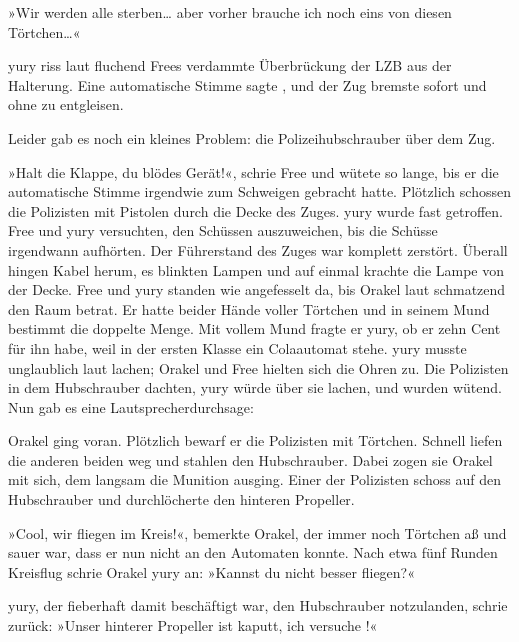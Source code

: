 »Wir werden alle sterben… aber vorher brauche ich noch eins von diesen Törtchen…«

yury riss laut fluchend Frees verdammte Überbrückung der LZB aus der Halterung. Eine automatische Stimme sagte , und der Zug bremste sofort und ohne zu entgleisen.


Leider gab es noch ein kleines Problem: die Polizeihubschrauber über dem Zug.


»Halt die Klappe, du blödes Gerät!«, schrie Free und wütete so lange, bis er die automatische Stimme irgendwie zum Schweigen gebracht hatte. Plötzlich schossen die Polizisten mit Pistolen durch die Decke des Zuges. yury wurde fast getroffen. Free und yury versuchten, den Schüssen auszuweichen, bis die Schüsse irgendwann aufhörten. Der Führerstand des Zuges war komplett zerstört. Überall hingen Kabel herum, es blinkten Lampen und auf einmal krachte die Lampe von der Decke. Free und yury standen wie angefesselt da, bis Orakel laut schmatzend den Raum betrat. Er hatte beider Hände voller Törtchen und in seinem Mund bestimmt die doppelte Menge. Mit vollem Mund fragte er yury, ob er zehn Cent für ihn habe, weil in der ersten Klasse ein Colaautomat stehe. yury musste unglaublich laut lachen; Orakel und Free hielten sich die Ohren zu. Die Polizisten in dem Hubschrauber dachten, yury würde über sie lachen, und wurden wütend. Nun gab es eine Lautsprecherdurchsage:


Orakel ging voran. Plötzlich bewarf er die Polizisten mit Törtchen. Schnell liefen die anderen beiden weg und stahlen den Hubschrauber. Dabei zogen sie Orakel mit sich, dem langsam die Munition ausging. Einer der Polizisten schoss auf den Hubschrauber und durchlöcherte den hinteren Propeller.

»Cool, wir fliegen im Kreis!«, bemerkte Orakel, der immer noch Törtchen aß und sauer war, dass er nun nicht an den Automaten konnte. Nach etwa fünf Runden Kreisflug schrie Orakel yury an: »Kannst du nicht besser fliegen?«

yury, der fieberhaft damit beschäftigt war, den Hubschrauber notzulanden, schrie zurück: »Unser hinterer Propeller ist kaputt, ich versuche !«


